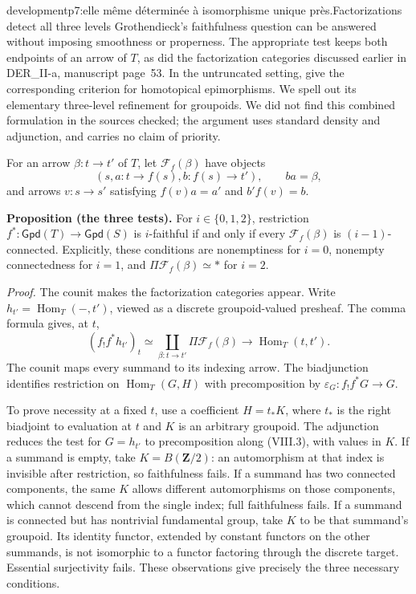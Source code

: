 \begin{dcomment}{development}{p7:elle même déterminée à isomorphisme unique près.}{Factorizations detect all three levels}
Grothendieck's faithfulness question can be answered without imposing smoothness or properness. The appropriate test keeps both endpoints of an arrow of $T$, as did the factorization categories discussed earlier in DER\_II-a, manuscript page~53. In the untruncated setting, \citet[arXiv version, Definition~6.9 and Theorem~6.10]{GrothStovicek2016Trees} give the corresponding criterion for homotopical epimorphisms. We spell out its elementary three-level refinement for groupoids. We did not find this combined formulation in the sources checked; the argument uses standard density and adjunction, and carries no claim of priority.

For an arrow $\beta:t\to t'$ of $T$, let $\mathcal F_f(\beta)$ have objects
\[
 (s,a:t\to f(s),b:f(s)\to t'),\qquad ba=\beta,
\]
and arrows $v:s\to s'$ satisfying $f(v)a=a'$ and $b'f(v)=b$.

\textbf{Proposition (the three tests).}\ours\quad
For $i\in\{0,1,2\}$, restriction $f^*:\mathsf{Gpd}(T)\to\mathsf{Gpd}(S)$ is $i$-faithful if and only if every $\mathcal F_f(\beta)$ is $(i-1)$-connected. Explicitly, these conditions are nonemptiness for $i=0$, nonempty connectedness for $i=1$, and $\Pi\mathcal F_f(\beta)\simeq*$ for $i=2$.

\emph{Proof.} The counit makes the factorization categories appear. Write $h_{t'}=\operatorname{Hom}_T(-,t')$, viewed as a discrete groupoid-valued presheaf. The comma formula gives, at $t$,
\[
 (f_!f^*h_{t'})_t
 \simeq\coprod_{\beta:t\to t'}\Pi\mathcal F_f(\beta)
 \longrightarrow \operatorname{Hom}_T(t,t').
 \tag{VIII.3}
\]
The counit maps every summand to its indexing arrow. The biadjunction identifies restriction on $\operatorname{Hom}_T(G,H)$ with precomposition by $\varepsilon_G:f_!f^*G\to G$.

To prove necessity at a fixed $t$, use a coefficient $H=t_*K$, where $t_*$ is the right biadjoint to evaluation at $t$ and $K$ is an arbitrary groupoid. The adjunction reduces the test for $G=h_{t'}$ to precomposition along (VIII.3), with values in $K$. If a summand is empty, take $K=B(\mathbf Z/2)$: an automorphism at that index is invisible after restriction, so faithfulness fails. If a summand has two connected components, the same $K$ allows different automorphisms on those components, which cannot descend from the single index; full faithfulness fails. If a summand is connected but has nontrivial fundamental group, take $K$ to be that summand's groupoid. Its identity functor, extended by constant functors on the other summands, is not isomorphic to a functor factoring through the discrete target. Essential surjectivity fails. These observations give precisely the three necessary conditions.


\end{dcomment}
